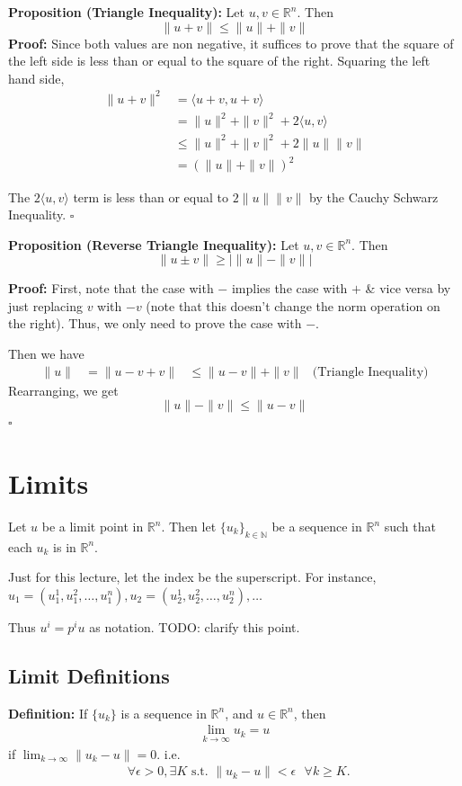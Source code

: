 \documentclass{article}
\newcommand*{\qed}{\hfill$\square$}%
\newcommand*{\txt}[1]{\text{ #1 }}%
\newcommand*{\iprod}[1]{\langle #1 \rangle}
\newcommand*{\fora}{\txt{}\forall}%
\newcommand*{\rr}{\mathbb{R}}%
\begin{document}
\textbf{Proposition (Triangle Inequality):} Let $u,v\in\rr^n$. Then \[
    \|u+v\|\leq\|u\|+\|v\|
\]
\textbf{Proof:} Since both values are non negative, it suffices to prove that the square of the left side is less than or equal to the square of the right. Squaring the left hand side, \begin{align*}
    \|u+v\|^2 &= \iprod{u+v,u+v} \\&= \|u\|^2 + \|v\|^2 + 2\iprod{u,v} \\&\leq \|u\|^2 + \|v\|^2 + 2\|u\|\|v\| \\&= (\|u\|+\|v\|)^2
\end{align*}

The $2\iprod{u,v}$ term is less than or equal to $2\|u\|\|v\|$ by the Cauchy Schwarz Inequality. \qed

\textbf{Proposition (Reverse Triangle Inequality):} Let $u,v\in\rr^n$. Then \[
    \|u\pm v\|\geq|\|u\|-\|v\||
\]

\textbf{Proof:} First, note that the case with $-$ implies the case with $+$ \& vice versa by just replacing $v$ with $-v$ (note that this doesn't change the norm operation on the right). Thus, we only need to prove the case with $-$.

Then we have \begin{align*}
    \|u\| &= \|u-v+v\|
    &\leq \|u-v\|+\|v\| &\text{(Triangle Inequality)}
\end{align*}
Rearranging, we get \[
    \|u\|-\|v\|\leq\|u-v\|
\]
\qed

\section{Limits}
Let $u$ be a limit point in $\rr^n$. Then let $\{u_k\}_{k\in \mathbb{N}}$ be a sequence in $\rr^n$ such that each $u_k$ is in $\rr^n$.

Just for this lecture, let the index be the superscript. For instance, $u_1=(u_1^1, u_1^2, \ldots, u_1^n), u_2=(u_2^1, u_2^2, \ldots, u_2^n), \ldots$

Thus $u^i=p^i u$ as notation. TODO: clarify this point. 

\subsection{Limit Definitions}
\textbf{Definition:} If $\{u_k\}$ is a sequence in $\rr^n$, and $u\in \rr^n$, then \begin{align*}
    \lim_{k\to\infty}u_k = u
\end{align*}
if $\lim_{k\to\infty}\|u_k-u\|=0$. i.e. \begin{align*}
    \fora \epsilon>0, \exists K\txt{s.t.}\|u_k-u\|<\epsilon\fora k\geq K.
\end{align*}
\end{document}
